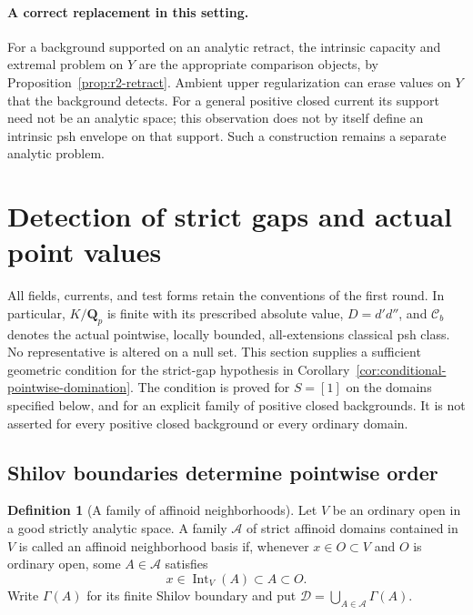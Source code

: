 \documentclass[11pt,a4paper]{article}
\numberwithin{equation}{section}
\theoremstyle{definition}
\newtheorem{definition}[theorem]{Definition}
\theoremstyle{remark}
\newcommand{\Cb}{\mathcal C_b}
\begin{document}
\paragraph{A correct replacement in this setting.}
For a background supported on an analytic retract, the intrinsic
capacity and extremal problem on $Y$ are the appropriate comparison
objects, by Proposition~\ref{prop:r2-retract}. Ambient upper
regularization can erase values on $Y$ that the background detects.
For a general positive closed current its support need not be an
analytic space; this observation does not by itself define an
intrinsic psh envelope on that support. Such a construction remains a
separate analytic problem.



\section{Detection of strict gaps and actual point values}
\label{sec:r2-gap-detection}

All fields, currents, and test forms retain the conventions of the first
round. In particular, $K/\mathbf Q_p$ is finite with its prescribed
absolute value, $D=d'd''$, and $\Cb$ denotes the actual pointwise,
locally bounded, all-extensions classical psh class. No representative
is altered on a null set. This section supplies a sufficient geometric
condition for the strict-gap hypothesis in
Corollary~\ref{cor:conditional-pointwise-domination}. The condition is
proved for $S=[1]$ on the domains specified below, and for an explicit
family of positive closed backgrounds. It is not asserted for every
positive closed background or every ordinary domain.

\subsection{Shilov boundaries determine pointwise order}

\begin{definition}[A family of affinoid neighborhoods]
Let $V$ be an ordinary open in a good strictly analytic space. A family
$\mathscr A$ of strict affinoid domains contained in $V$ is called an
affinoid neighborhood basis if, whenever $x\in O\subset V$ and $O$ is
ordinary open, some $A\in\mathscr A$ satisfies
\[
 x\in\operatorname{Int}_V(A)\subset A\subset O.
\]
Write $\Gamma(A)$ for its finite Shilov boundary and put
$\mathscr D=\bigcup_{A\in\mathscr A}\Gamma(A)$.
\end{definition}
\end{document}

